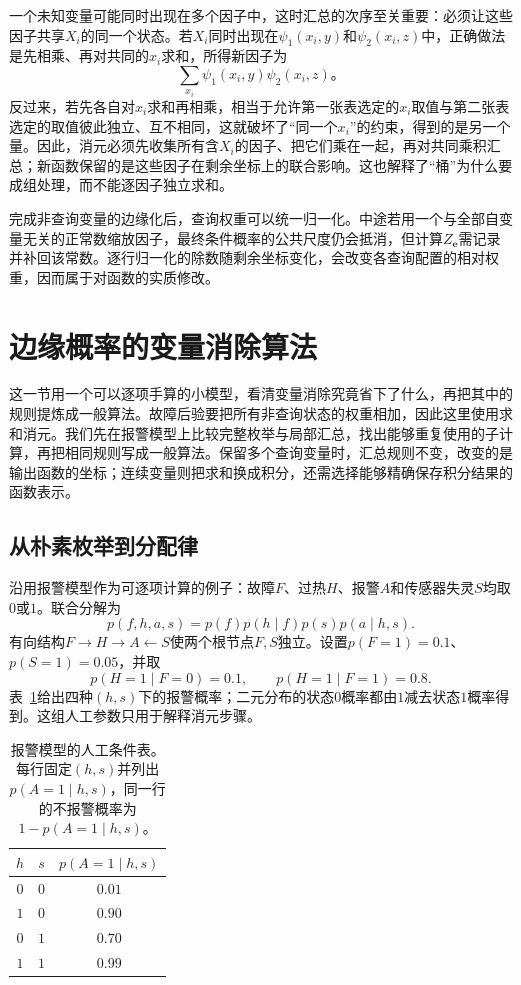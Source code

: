 一个未知变量可能同时出现在多个因子中，这时汇总的次序至关重要：必须让这些因子共享$X_i$的同一个状态。若$X_i$同时出现在$\psi_1(x_i,y)$和$\psi_2(x_i,z)$中，正确做法是先相乘、再对共同的$x_i$求和，所得新因子为
\[
  \sum_{x_i}\psi_1(x_i,y)\psi_2(x_i,z)\text{。}
\]
反过来，若先各自对$x_i$求和再相乘，相当于允许第一张表选定的$x_i$取值与第二张表选定的取值彼此独立、互不相同，这就破坏了“同一个$x_i$”的约束，得到的是另一个量。因此，消元必须先收集所有含$X_i$的因子、把它们乘在一起，再对共同乘积汇总；新函数保留的是这些因子在剩余坐标上的联合影响。这也解释了“桶”为什么要成组处理，而不能逐因子独立求和。

完成非查询变量的边缘化后，查询权重可以统一归一化。中途若用一个与全部自变量无关的正常数缩放因子，最终条件概率的公共尺度仍会抵消，但计算$Z_{\bm{e}}$需记录并补回该常数。逐行归一化的除数随剩余坐标变化，会改变各查询配置的相对权重，因而属于对函数的实质修改。

\section{边缘概率的变量消除算法}
\label{sec:pgm-elimination-sum-product}

这一节用一个可以逐项手算的小模型，看清变量消除究竟省下了什么，再把其中的规则提炼成一般算法。故障后验要把所有非查询状态的权重相加，因此这里使用求和消元。我们先在报警模型上比较完整枚举与局部汇总，找出能够重复使用的子计算，再把相同规则写成一般算法。保留多个查询变量时，汇总规则不变，改变的是输出函数的坐标；连续变量则把求和换成积分，还需选择能够精确保存积分结果的函数表示。

\subsection{从朴素枚举到分配律}
\label{sec:pgm-elimination-distributivity}

沿用报警模型作为可逐项计算的例子：故障$F$、过热$H$、报警$A$和传感器失灵$S$均取$0$或$1$。联合分解为
\begin{equation}
  p(f,h,a,s)=p(f)p(h\mid f)p(s)p(a\mid h,s).
  \label{eq:pgm-elimination-alarm-model}
\end{equation}
有向结构$F\to H\to A\leftarrow S$使两个根节点$F,S$独立。设置$p(F=1)=0.1$、$p(S=1)=0.05$，并取
\[
  p(H=1\mid F=0)=0.1,\qquad
  p(H=1\mid F=1)=0.8.
\]
表~\ref{tab:pgm-elimination-alarm-cpt}给出四种$(h,s)$下的报警概率；二元分布的状态$0$概率都由$1$减去状态$1$概率得到。这组人工参数只用于解释消元步骤。

\begin{table}[htbp]
  \centering
  \begin{tabular}{ccc}
    \toprule
    $h$ & $s$ & $p(A=1\mid h,s)$\\
    \midrule
    $0$ & $0$ & $0.01$\\
    $1$ & $0$ & $0.90$\\
    $0$ & $1$ & $0.70$\\
    $1$ & $1$ & $0.99$\\
    \bottomrule
  \end{tabular}
  \caption{报警模型的人工条件表。每行固定$(h,s)$并列出$p(A=1\mid h,s)$，同一行的不报警概率为$1-p(A=1\mid h,s)$。}
  \label{tab:pgm-elimination-alarm-cpt}
\end{table}


